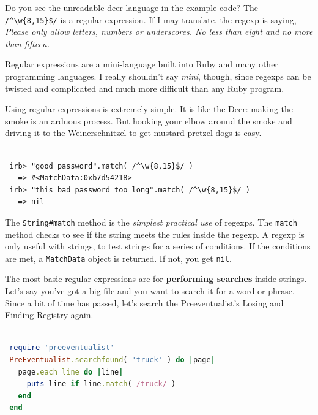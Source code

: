 \documentclass[10pt,twoside]{report}
\begin{document}
Do you see the unreadable deer language in the example code?  The
\lstinline[breaklines=true]|/^\w{8,15}$/| is a regular expression.  If
I may translate, the regexp is saying, {\em Please only allow letters,
  numbers or underscores.  No less than eight and no more than
  fifteen.}

Regular expressions are a mini-language built into Ruby and many other
programming languages. I really shouldn't say {\em mini}, though,
since regexps can be twisted and complicated and much more difficult
than any Ruby program.

Using regular expressions is extremely simple.  It is like the Deer:
making the smoke is an arduous process.  But hooking your elbow around
the smoke and driving it to the Weinerschnitzel to get mustard pretzel
dogs is easy.


\begin{lstlisting}

 irb> "good_password".match( /^\w{8,15}$/ )
   => #<MatchData:0xb7d54218>
 irb> "this_bad_password_too_long".match( /^\w{8,15}$/ )
   => nil

\end{lstlisting}


The \lstinline[breaklines=true]|String#match| method is the {\em
  simplest practical use} of regexps.  The
\lstinline[breaklines=true]|match| method checks to see if the string
meets the rules inside the regexp.  A regexp is only useful with
strings, to test strings for a series of conditions.  If the
conditions are met, a \lstinline[breaklines=true]|MatchData| object is
returned.  If not, you get \lstinline[breaklines=true]|nil|.

The most basic regular expressions are for {\bf performing searches}
inside strings.  Let's say you've got a big file and you want to
search it for a word or phrase.  Since a bit of time has passed, let's
search the Preeventualist's Losing and Finding Registry again.


\begin{lstlisting}[basicstyle=\ttfamily\color{basiccolor},
    commentstyle = \ttfamily\color{commentcolor},
    keywordstyle=\ttfamily\color{keywordscolor},
    stringstyle=\color{stringcolor},
    language=Ruby,
    basicstyle=\small\ttfamily,
    showstringspaces=false,
  ]

 require 'preeventualist'
 PreEventualist.searchfound( 'truck' ) do |page|
   page.each_line do |line|
     puts line if line.match( /truck/ )
   end
 end

\end{lstlisting}
\end{document}
